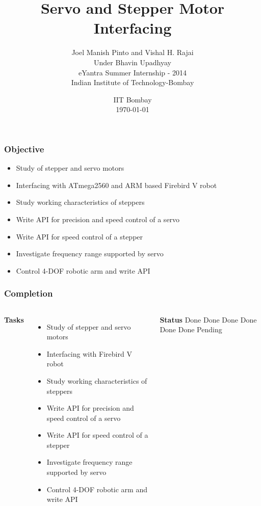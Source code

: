 \documentclass[table,10pt,red]{beamer}	%
\title
[
	Servo and Stepper Motor Interfacing	%
	\hspace{2cm}
	\insertframenumber/\inserttotalframenumber
]
{
	Servo and Stepper Motor Interfacing
}
\author
[
	Joel Pinto and Vishal Rajai
]
{
	Joel Manish Pinto and Vishal H. Rajai \\
	Under Bhavin Upadhyay \\
	eYantra Summer Internship - 2014\\
	Indian Institute of Technology-Bombay \\
}
\date
{
	IIT Bombay \\ {\today}
}
\begin{document}
\begin{frame}
	\titlepage
\end{frame}

\begin{frame}
	\frametitle{Objective}
	\begin{itemize}
		\item Study of stepper and servo motors
		\item Interfacing with ATmega2560 and ARM based Firebird V robot
		\item Study working characteristics of steppers
		\item Write API for precision and speed control of a servo
		\item Write API for speed control of a stepper
		\item Investigate frequency range supported by servo
		\item Control 4-DOF robotic arm and write API
	\end{itemize}
\end{frame}


\begin{frame}
	\frametitle{Completion}
	\begin{columns}[t]
		\textbf{Tasks}
		\begin{itemize}
			\item Study of stepper and servo motors
			\item Interfacing with Firebird V robot
			\item Study working characteristics of steppers
			\item Write API for precision and speed control of a servo
			\item Write API for speed control of a stepper
			\item Investigate frequency range supported by servo
			\item Control 4-DOF robotic arm and write API
		\end{itemize}
		\textbf{Status} \vspace{3.5pt}
		Done \vspace{3.5pt}
		Done \vspace{3.5pt}
		Done \vspace{3.5pt}
		Done \vspace{3.5pt}
		Done \vspace{3.5pt}
		Done \vspace{3.5pt}
		Pending
	\end{columns}
\end{frame}
\end{document}
